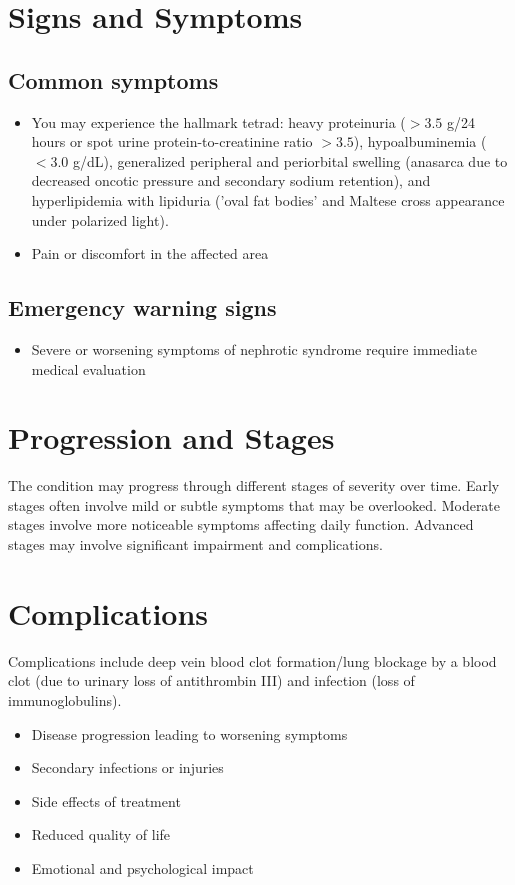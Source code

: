 \section{Signs and Symptoms}

\subsection{Common symptoms}
\begin{itemize}[noitemsep]
  \item You may experience the hallmark tetrad: heavy proteinuria ($>3.5$ g/24 hours or spot urine protein-to-creatinine ratio $>3.5$), hypoalbuminemia ($<3.0$ g/dL), generalized peripheral and periorbital swelling (anasarca due to decreased oncotic pressure and secondary sodium retention), and hyperlipidemia with lipiduria ('oval fat bodies' and Maltese cross appearance under polarized light).

  \item Pain or discomfort in the affected area
  \end{itemize}

\subsection{Emergency warning signs}
\begin{itemize}[noitemsep]
  \item Severe or worsening symptoms of nephrotic syndrome require immediate medical evaluation
\end{itemize}
\section{Progression and Stages}
The condition may progress through different stages of severity over time. Early stages often involve mild or subtle symptoms that may be overlooked. Moderate stages involve more noticeable symptoms affecting daily function. Advanced stages may involve significant impairment and complications.
\section{Complications}
Complications include deep vein blood clot formation/lung blockage by a blood clot (due to urinary loss of antithrombin III) and infection (loss of immunoglobulins).

\begin{itemize}[noitemsep]
  \item Disease progression leading to worsening symptoms
  \item Secondary infections or injuries
  \item Side effects of treatment
  \item Reduced quality of life
  \item Emotional and psychological impact
\end{itemize}
